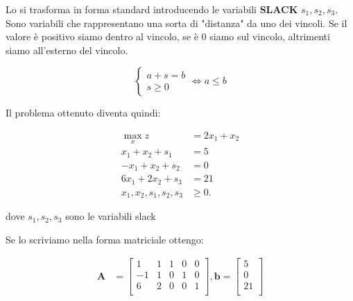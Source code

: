 \documentclass[a4paper, 11pt]{article}
\begin{document}
            Lo si trasforma in forma standard introducendo le variabili \textbf{SLACK} $s_1, s_2, s_3$. Sono variabili che rappresentano una sorta di "distanza" da uno dei vincoli. Se il valore è positivo siamo dentro al vincolo, se è 0 siamo sul vincolo, altrimenti siamo all'esterno del vincolo.

            \[
                \begin{cases}
                    a+s = b \\
                    s \geq 0
                \end{cases}
                \iff a \leq b 
            \]            
            
            Il problema ottenuto diventa quindi:



            \begin{align*}
                \max_{x} z &= 2x_1 + x_2 \\
                x_1 + x_2 + s_1 &= 5 \\
                -x_1 + x_2 + s_2 &= 0 \\
                6x_1 + 2x_2 + s_3 &= 21 \\
                x_1, x_2, s_1, s_2, s_3 &\geq 0.
            \end{align*}



            dove $s_1, s_2, s_3$ sono le variabili slack
            
            


            Se lo scriviamo nella forma matriciale ottengo:


            \begin{align*}
                \mathbf{A} &= 
                \begin{bmatrix}
                1 & 1 & 1 & 0 & 0 \\
                -1 & 1 & 0 & 1 & 0 \\
                6 & 2 & 0 & 0 & 1 \\
                \end{bmatrix},
                \mathbf{b} = 
                    \begin{bmatrix}
                        5 \\
                        0 \\
                        21 \\
                    \end{bmatrix}
                \end{align*}
\end{document}
